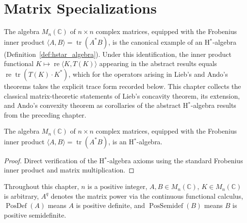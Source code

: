 \chapter{Matrix Specializations}

The algebra $M_n(\mathbb{C})$ of $n \times n$ complex matrices, equipped with the
Frobenius inner product $\langle A, B \rangle = \operatorname{tr}(A^* B)$, is the
canonical example of an H$^*$-algebra (Definition~\ref{def:hstar_algebra}).
Under this identification, the inner product functional $K \mapsto \operatorname{re}\langle K, T(K) \rangle$
appearing in the abstract results equals $\operatorname{re}\operatorname{tr}(T(K) \cdot K^*)$,
which for the operators arising in Lieb's and Ando's theorems takes the explicit
trace form recorded below.
This chapter collects the classical matrix-theoretic statements of Lieb's concavity
theorem, its extension, and Ando's convexity theorem as corollaries of the abstract
H$^*$-algebra results from the preceding chapter.

\begin{proposition}
  \label{inst:hstar_matrix}
  \leanok
  The algebra $M_n(\mathbb{C})$ of $n \times n$ complex matrices, equipped with the
  Frobenius inner product $\langle A, B \rangle = \operatorname{tr}(A^* B)$, is an
  H$^*$-algebra.
  \begin{proof}
    \leanok
    Direct verification of the H$^*$-algebra axioms using the standard Frobenius
    inner product and matrix multiplication.
  \end{proof}
\end{proposition}

Throughout this chapter, $n$ is a positive integer, $A, B \in M_n(\mathbb{C})$,
$K \in M_n(\mathbb{C})$ is arbitrary, $A^q$ denotes the matrix power via the
continuous functional calculus, $\operatorname{PosDef}(A)$ means $A$ is positive
definite, and $\operatorname{PosSemidef}(B)$ means $B$ is positive semidefinite.

